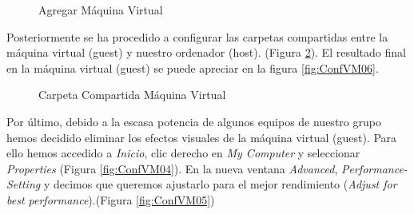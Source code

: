 \documentclass{scrartcl}
\begin{document}
\begin{figure}[H]
	
	\centering
	\caption{Agregar Máquina Virtual}
	\label{fig:ConfVM02}
	
\end{figure}

Posteriormente se ha procedido a configurar las carpetas compartidas entre la máquina virtual (guest) y nuestro ordenador (host). (Figura \ref{fig:ConfVM03}). El resultado final en la máquina virtual (guest) se puede apreciar en la figura \ref{fig:ConfVM06}.

\begin{figure}[H]
	
	\centering
	\caption{Carpeta Compartida Máquina Virtual}
	\label{fig:ConfVM03}
	
\end{figure}

Por último, debido a la escasa potencia de algunos equipos de nuestro grupo hemos decidido eliminar los efectos visuales de la máquina virtual (guest). Para ello hemos accedido a \textit{Inicio}, clic derecho en \textit{My Computer} y seleccionar \textit{Properties} (Figura \ref{fig:ConfVM04}). En la nueva ventana \textit{Advanced}, \textit{Performance-Setting} y decimos que queremos ajustarlo para el mejor rendimiento (\textit{Adjust for best performance}).(Figura \ref{fig:ConfVM05})
\end{document}
